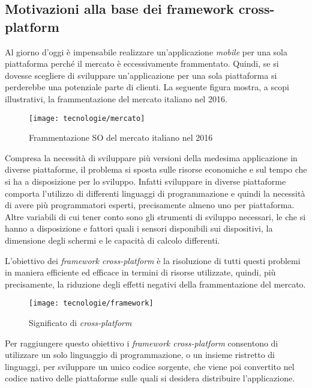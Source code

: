 \subsection{Motivazioni alla base dei framework cross-platform}

Al giorno d'oggi è impensabile realizzare un'applicazione \textit{mobile} per una sola piattaforma perché il mercato è eccessivamente frammentato. Quindi, se si dovesse scegliere di sviluppare un'applicazione per una sola piattaforma si perderebbe una potenziale parte di clienti. La seguente figura mostra, a scopi illustrativi, la frammentazione del mercato italiano nel 2016.

\begin{figure}[!h] 
    \centering 
    \texttt{[image: tecnologie/mercato]} 
    \caption{Frammentazione SO del mercato italiano nel 2016}
\end{figure}

Compresa la necessità di sviluppare più versioni della medesima applicazione in diverse piattaforme, il problema si sposta sulle risorse economiche e sul tempo che si ha a disposizione per lo sviluppo. Infatti sviluppare in diverse piattaforme comporta l'utilizzo di differenti linguaggi di programmazione e quindi la necessità di avere più programmatori esperti, precisamente almeno uno per piattaforma. Altre variabili di cui tener conto sono gli strumenti di sviluppo necessari, le  che si hanno a disposizione e fattori quali i sensori disponibili sui dispositivi, la dimensione degli schermi e le capacità di calcolo differenti.

L'obiettivo dei \textit{framework cross-platform} è la risoluzione di tutti questi problemi in maniera efficiente ed efficace in termini di risorse utilizzate, quindi, più precisamente, la riduzione degli effetti negativi della frammentazione del mercato.

\begin{figure}[!h] 
    \centering 
    \texttt{[image: tecnologie/framework]} 
    \caption{Significato di \textit{cross-platform}}
\end{figure}

Per raggiungere questo obiettivo i \textit{framework cross-platform} consentono di utilizzare un solo linguaggio di programmazione, o un insieme ristretto di linguaggi, per sviluppare un unico codice sorgente, che viene poi convertito nel codice nativo delle piattaforme sulle quali si desidera distribuire l'applicazione. 

